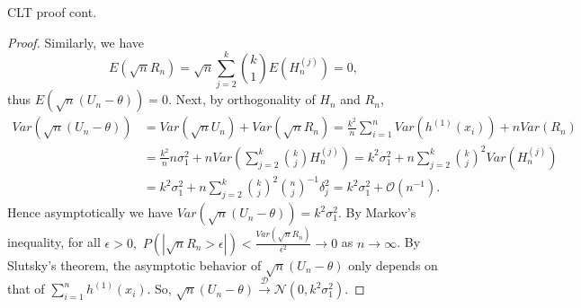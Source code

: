 \documentclass{beamer}
\theoremstyle{definition}
\numberwithin{Def}{section}
\begin{document}
      \begin{frame}{CLT proof cont. }
      \begin{fontsize}{7}{12}
      \begin{proof}
        Similarly, we have $$E(\sqrt{n}R_n) = \sqrt{n} \sum_{j = 2}^k {k \choose 1} E(H_n^{(j)}) = 0,$$
      thus $E\left( \sqrt{n}(U_n - \theta) \right) = 0. $ 
      Next, by orthogonality of $H_n$ and $R_n$,
      \begin{align*}
          Var(\sqrt{n}(U_n - \theta) ) &= Var(\sqrt{n} U_n) + Var(\sqrt{n}R_n) 
          = \frac{k^2}{n} \sum_{i = 1}^n Var(h^{(1)} (x_i) )  + n Var(R_n) \\
          &= \frac{k^2}{n} n \sigma_1^2 + n Var( \sum_{j = 2}^k {k \choose j} H_n^{(j)}) 
          = k^2 \sigma_1^2 + n \sum_{j = 2}^k {k \choose j}^2 Var(H_n^{(j)}) \\
          &= k^2 \sigma_1^2 + n \sum_{j = 2}^k {k \choose j}^2 {n \choose j}^{-1} \delta_j^2 
          = k^2 \sigma_1^2 + \mathcal{O}(n^{-1}).
      \end{align*}
      Hence asymptotically we have $Var(\sqrt{n}(U_n - \theta) ) = k^2 \sigma_1^2$. 
      By Markov's inequality, for all $\epsilon > 0,$ $P(|\sqrt{n}R_n > \epsilon| ) < \frac{Var(\sqrt{n} R_n)}{\epsilon^2} \rightarrow 0$ as $n \rightarrow \infty$.
      By Slutsky's theorem, the asymptotic behavior of $\sqrt{n}(U_n - \theta)$ only depends on that of $ \sum_{i = 1}^{n}h^{(1)} (x_i)$. So, $ \sqrt{n}(U_n - \theta) \xrightarrow{\mathcal{D}} \mathcal{N}(0, k^2 \sigma_1^2 ).$
    \end{proof}
    \end{fontsize}
\end{frame}

    
\end{document}
